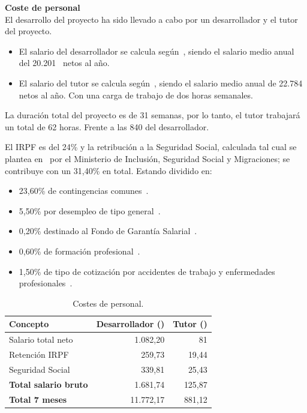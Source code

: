 \textbf{Coste de personal}\\
El desarrollo del proyecto ha sido llevado a cabo por un desarrollador y el tutor del proyecto.
\begin{itemize}
\item El salario del desarrollador se calcula según~\cite{SalarioJunior}, siendo el salario medio anual del 20.201~\officialeuro{} netos al año.
\item El salario del tutor se calcula según~\cite{SalarioInvestigador}, siendo el salario medio anual de 22.784~\officialeuro{} netos al año. Con una carga de trabajo de dos horas semanales.
\end{itemize}

La duración total del proyecto es de 31 semanas, por lo tanto, el tutor trabajará un total de 62 horas. Frente a las 840 del desarrollador.

El IRPF es del 24\% y la retribución a la Seguridad Social, calculada tal cual se plantea en~\cite{ss_cotizacion} por el Ministerio de Inclusión, Seguridad Social y Migraciones; se contribuye con un 31,40\% en total. Estando dividido en:
\begin{itemize}
\tightlist
\item 23,60\% de contingencias comunes~\cite{BOEPCM2442022}.
\item 5,50\% por desempleo de tipo general~\cite{BOEPCM2442022}.
\item 0,20\% destinado al Fondo de Garantía Salarial~\cite{BOEPCM2442022}.
\item 0,60\% de formación profesional~\cite{BOEPCM2442022}.
\item 1,50\% de tipo de cotización por accidentes de trabajo y enfermedades profesionales~\cite{BOEENFERMEDADES}.
\end{itemize}

\begin{table}[H]
\centering
\begin{tabular}{lrr}
	\toprule
	\textbf{Concepto} & \textbf{Desarrollador (\officialeuro)} & \textbf{Tutor (\officialeuro)}\\
	\midrule
	Salario total neto & 1.082,20 & 81 \\
	Retención IRPF & 259,73 & 19,44 \\
	Seguridad Social & 339,81 & 25,43 \\
	\midrule
	\textbf{Total salario bruto} &  1.681,74 & 125,87  \\
	\midrule
	\textbf{Total 7 meses} & 11.772,17 & 881,12 \\
	\bottomrule
\end{tabular}
\caption{Costes de personal.}\label{tab:costes-personal}
\end{table}

